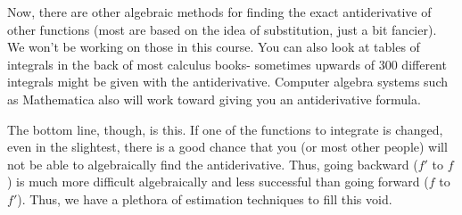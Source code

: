\documentclass{ximera}
\begin{document}
Now, there are other algebraic methods for finding the exact antiderivative of other functions (most are based on the idea of substitution, just a bit fancier).  We won't be working on those in this course.  You can also look at tables of integrals in the back of most calculus books- sometimes upwards of $300$ different integrals might be given with the antiderivative.  Computer algebra systems such as Mathematica also will work toward giving you an antiderivative formula.

 The bottom line, though, is this.  If one of the functions to integrate is changed, even in the slightest, there is a good chance that you (or most other people) will not be able to algebraically find the antiderivative.  Thus, going backward ($f'$ to $f$) is much more difficult algebraically and less successful than going forward ($f$ to  $f'$).  Thus, we have a plethora of estimation techniques to fill this void.
\end{document}
